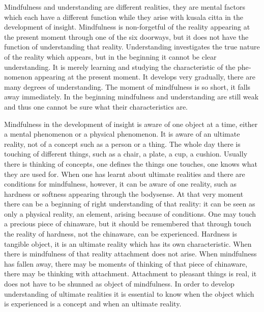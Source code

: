\documentclass{book}
\begin{document}
Mindfulness and understanding are different realities, they are mental
factors which each have a different function while they arise with
kusala citta in the development of insight. Mindfulness is non-forgetful
of the reality appearing at the present moment through one of the six
doorways, but it does not have the function of understanding that
reality. Understanding investigates the true nature of the reality which
appears, but in the beginning it cannot be clear understanding. It is
merely learning and studying the characteristic of the phe­nomenon
appearing at the present moment. It develops very gradually, there are
many degrees of understanding. The moment of mindfulness is so short, it
falls away immediately. In the beginning mindfulness and under­standing
are still weak and thus one cannot be sure what their characteristics
are.

Mindfulness in the development of insight is aware of one object at a
time, either a mental phenomenon or a physical phenomenon. It is aware
of an ultimate reality, not of a concept such as a person or a thing.
The whole day there is touching of different things, such as a chair, a
plate, a cup, a cushion. Usually there is thinking of concepts, one
defines the things one touches, one knows what they are used for. When
one has learnt about ultimate realities and there are conditions for
mindfulness, however, it can be aware of one reality, such as hardness
or softness appearing through the bodysense. At that very moment there
can be a beginning of right understanding of that reality: it can be
seen as only a physical reality, an element, arising because of
conditions. One may touch a precious piece of chinaware, but it should
be remembered that through touch the reality of hardness, not the
china­ware, can be experienced. Hardness is tangible object, it is an
ultimate reality which has its own characteristic. When there is
mindfulness of that reality attachment does not arise. When mindfulness has
fallen away, there may be moments of thinking of that piece of
chinaware, there may be thinking with attachment. Attachment to pleasant
things is real, it does not have to be shunned as object of mindfulness.
In order to develop understanding of ultimate realities it is essential
to know when the object which is experienced is a concept and when an
ultimate reality.
\end{document}
